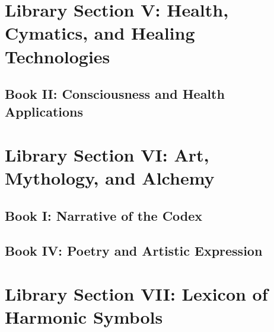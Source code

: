 \documentclass[a4paper,12pt]{book}
\begin{document}
\part{Library Section V: Health, Cymatics, and Healing Technologies}

\chapter{Book II: Consciousness and Health Applications}



\part{Library Section VI: Art, Mythology, and Alchemy}

\chapter{Book I: Narrative of the Codex}









\chapter{Book IV: Poetry and Artistic Expression}


\part{Library Section VII: Lexicon of Harmonic Symbols}
\end{document}
